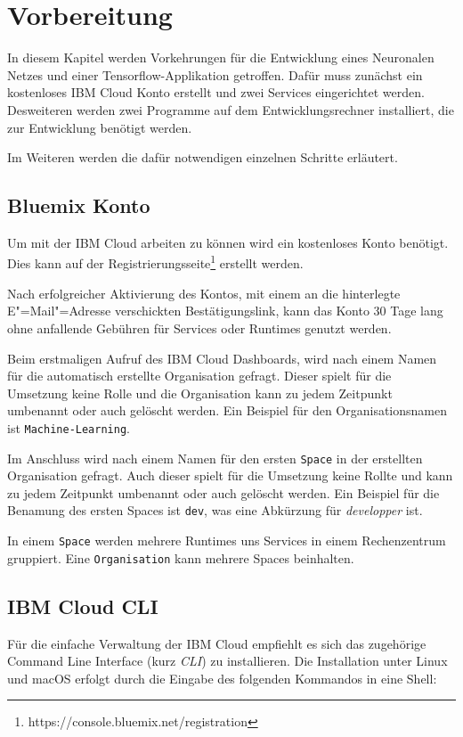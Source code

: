 \section{Vorbereitung}
In diesem Kapitel werden Vorkehrungen für die Entwicklung eines Neuronalen Netzes und einer Tensorflow-Applikation
getroffen. Dafür muss zunächst ein kostenloses IBM Cloud Konto erstellt und zwei Services eingerichtet werden.
Desweiteren werden zwei Programme auf dem Entwicklungsrechner installiert, die zur Entwicklung benötigt werden.

Im Weiteren werden die dafür notwendigen einzelnen Schritte erläutert.

\subsection{Bluemix Konto}
Um mit der IBM Cloud arbeiten zu können wird ein kostenloses Konto benötigt. Dies kann auf der
Registrierungsseite\footnote{https://console.bluemix.net/registration} erstellt werden.

Nach erfolgreicher Aktivierung des Kontos, mit einem an die hinterlegte E"=Mail"=Adresse verschickten Bestätigungslink,
kann das Konto 30 Tage lang ohne anfallende Gebühren für Services oder Runtimes genutzt werden.

Beim erstmaligen Aufruf des IBM Cloud Dashboards, wird nach einem Namen für die automatisch erstellte Organisation
gefragt. Dieser spielt für die Umsetzung keine Rolle und die Organisation kann zu jedem Zeitpunkt umbenannt oder auch
gelöscht werden. Ein Beispiel für den Organisationsnamen ist \texttt{Machine-Learning}.

Im Anschluss wird nach einem Namen für den ersten \texttt{Space} in der erstellten Organisation gefragt. Auch dieser
spielt für die Umsetzung keine Rollte und kann zu jedem Zeitpunkt umbenannt oder auch gelöscht werden. Ein Beispiel für
die Benamung des ersten Spaces ist \texttt{dev}, was eine Abkürzung für \textit{developper} ist.

In einem \texttt{Space} werden mehrere Runtimes uns Services in einem Rechenzentrum gruppiert. Eine \texttt{Organisation}
kann mehrere Spaces beinhalten.

\subsection{IBM Cloud CLI}
Für die einfache Verwaltung der IBM Cloud empfiehlt es sich das zugehörige Command Line Interface (kurz \textit{CLI}) zu
installieren. Die Installation unter Linux und macOS erfolgt durch die Eingabe des folgenden Kommandos in eine Shell:

